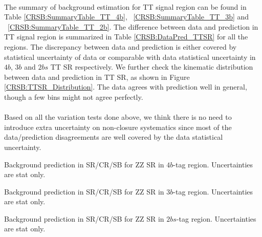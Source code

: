 \paragraph{}
The summary of background estimation for TT signal region can be found in Table \ref{CRSB:SummaryTable_TT_4b}, ~\ref{CRSB:SummaryTable_TT_3b} and ~\ref{CRSB:SummaryTable_TT_2b}. The difference between data and prediction in TT signal region is summarized in Table \ref{CRSB:DataPred_TTSR} for all the regions. The discrepancy between data and prediction is either covered by statistical uncertainty of data or comparable with data statistical uncertainty in $4b$, $3b$ and $2bs$ TT SR respectively. We further check the kinematic distribution between data and prediction in TT SR, as shown in Figure \ref{CRSB:TTSR_Distribution}. The data agrees with prediction well in general, though a few bins might not agree perfectly. 

\paragraph{}
Based on all the variation tests done above, we think there is no need to introduce extra uncertainty on non-closure systematics since most of the data/prediction disagreements are well covered by the data statistical uncertainty.

\begin{table}[htbp!]
\begin{center}

\end{center}
\caption{Background prediction in SR/CR/SB for ZZ SR in $4b$-tag region. Uncertainties are stat only.}
\label{CRSB:SummaryTable_ZZ_4b}
\end{table}

\begin{table}[htbp!]
\begin{center}

\end{center}
\caption{Background prediction in SR/CR/SB for ZZ SR in $3b$-tag region. Uncertainties are stat only.}
\label{CRSB:SummaryTable_ZZ_3b}
\end{table}

\begin{table}[htbp!]
\begin{center}

\end{center}
\caption{Background prediction in SR/CR/SB for ZZ SR in $2bs$-tag region. Uncertainties are stat only.}
\label{CRSB:SummaryTable_ZZ_2b}
\end{table}

